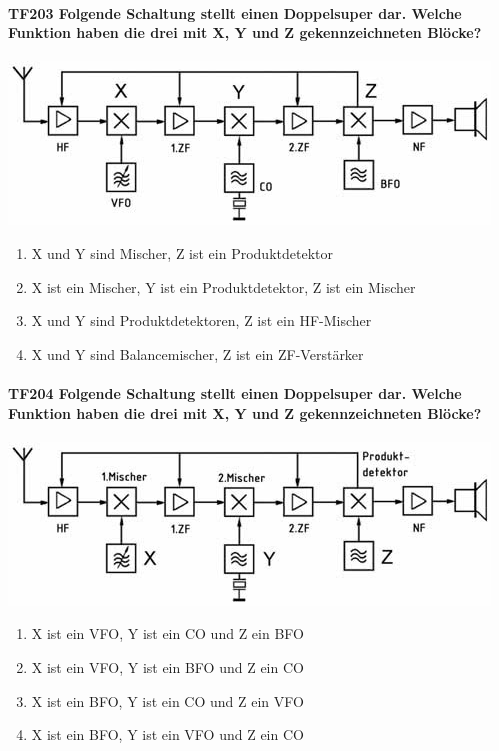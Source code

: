 \documentclass[8pt]{article}
\begin{document}
\begin{enumerate}
\paragraph*{TF203 Folgende Schaltung stellt einen Doppelsuper dar. Welche Funktion haben die drei mit X, Y und Z gekennzeichneten Blöcke?}
\begin{center}
	\begin{minipage}{\linewidth}
		\centering
		\includegraphics[scale=1.0]{pics/tf203_a.jpg}
	\end{minipage}
\end{center}
\begin{enumerate}[nolistsep,label=\Alph*]
\item X und Y sind Mischer, Z ist ein Produktdetektor
\item X ist ein Mischer, Y ist ein Produktdetektor, Z ist ein Mischer
\item X und Y sind Produktdetektoren, Z ist ein HF-Mischer
\item X und Y sind Balancemischer, Z ist ein ZF-Verstärker
\end{enumerate}

\paragraph*{TF204 Folgende Schaltung stellt einen Doppelsuper dar. Welche Funktion haben die drei mit X, Y und Z gekennzeichneten Blöcke?}
\begin{center}
	\begin{minipage}{\linewidth}
		\centering
		\includegraphics[scale=1.0]{pics/tf204_a.jpg}
	\end{minipage}
\end{center}
\begin{enumerate}[nolistsep,label=\Alph*]
\item X ist ein VFO, Y ist ein CO und Z ein BFO
\item X ist ein VFO, Y ist ein BFO und Z ein CO
\item X ist ein BFO, Y ist ein CO und Z ein VFO
\item X ist ein BFO, Y ist ein VFO und Z ein CO
\end{enumerate}


\end{enumerate}
\end{document}
